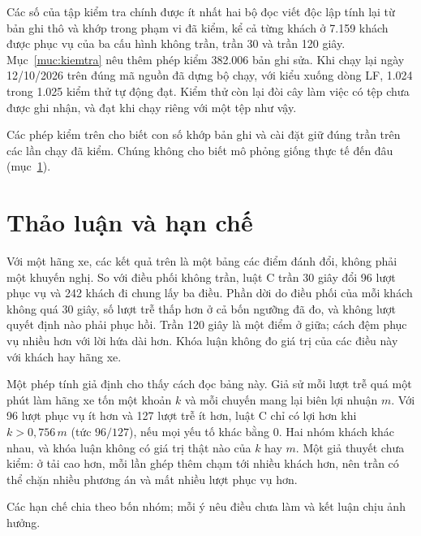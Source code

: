 Các số của tập kiểm tra chính được ít nhất hai bộ đọc viết độc lập tính lại từ bản ghi thô và khớp trong phạm vi đã
kiểm, kể cả từng khách ở 7.159 khách được phục vụ của ba cấu hình không trần, trần 30 và trần 120 giây.
Mục~\ref{muc:kiemtra} nêu thêm phép kiểm 382.006 bản ghi sửa. Khi chạy lại ngày 12/10/2026 trên đúng mã nguồn đã dựng
bộ chạy, với kiểu xuống dòng LF, 1.024 trong 1.025 kiểm thử tự động đạt. Kiểm thử còn lại đòi cây làm việc có tệp chưa
được ghi nhận, và đạt khi chạy riêng với một tệp như vậy.

Các phép kiểm trên cho biết con số khớp bản ghi và cài đặt giữ đúng trần trên các lần chạy đã kiểm. Chúng không cho
biết mô phỏng giống thực tế đến đâu (mục~\ref{muc:c4-thaoluan}).

\section{Thảo luận và hạn chế}
\label{muc:c4-thaoluan}

Với một hãng xe, các kết quả trên là một bảng các điểm đánh đổi, không phải một khuyến nghị. So với điều phối không
trần, luật C trần 30 giây đổi 96 lượt phục vụ và 242 khách đi chung lấy ba điều. Phần dời do điều phối của mỗi khách
không quá 30 giây, số lượt trễ thấp hơn ở cả bốn ngưỡng đã đo, và không lượt quyết định nào phải phục hồi. Trần 120
giây là một điểm ở giữa; cách đệm phục vụ nhiều hơn với lời hứa dài hơn. Khóa luận không đo giá trị của các điều này
với khách hay hãng xe.

Một phép tính giả định cho thấy cách đọc bảng này. Giả sử mỗi lượt trễ quá một phút làm hãng xe tốn một khoản $k$ và
mỗi chuyến mang lại biên lợi nhuận $m$. Với 96 lượt phục vụ ít hơn và 127 lượt trễ ít hơn, luật C chỉ có lợi hơn khi
$k > 0{,}756\,m$ (tức $96/127$), nếu mọi yếu tố khác bằng 0. Hai nhóm khách khác nhau, và khóa luận không có giá trị
thật nào của $k$ hay $m$. Một giả thuyết chưa kiểm: ở tải cao hơn, mỗi lần ghép thêm chạm tới nhiều khách hơn, nên
trần có thể chặn nhiều phương án và mất nhiều lượt phục vụ hơn.

Các hạn chế chia theo bốn nhóm; mỗi ý nêu điều chưa làm và kết luận chịu ảnh hưởng.

